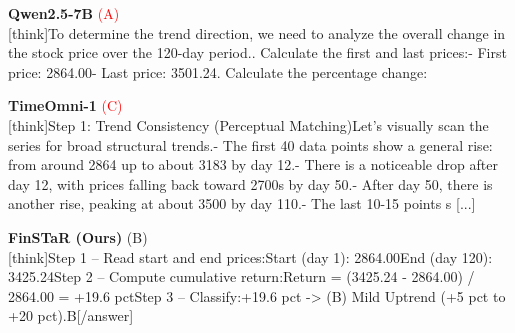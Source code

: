 \noindent
\begin{minipage}[t]{0.28\textwidth}
\colorbox{red!8}{\parbox{\dimexpr\textwidth-2\fboxsep}{
\textbf{Qwen2.5-7B} \textcolor{red}{(A)} \\[2pt]
\tiny
[think]\newline To determine the trend direction, we need to analyze the overall change in the stock price over the 120-day period.. Calculate the first and last prices:\newline    - First price: 2864.00\newline    - Last price: 3501.24. Calculate the percentage change:\newline    [\newline    (Percentage Change) = ( ((Last Price) - (First Price))((First Price)) )  100\newline    ]\newline    [\newline    (Percentage Change) = ( (3501.24 - 2864.00)(2864.00 [...]
}}
\end{minipage}
\hfill
\begin{minipage}[t]{0.28\textwidth}
\colorbox{red!8}{\parbox{\dimexpr\textwidth-2\fboxsep}{
\textbf{TimeOmni-1} \textcolor{red}{(C)} \\[2pt]
\tiny
[think]\newline Step 1: Trend Consistency (Perceptual Matching)\newline Let's visually scan the series for broad structural trends.\newline - The first  40 data points show a general rise: from around 2864 up to about 3183 by day 12.\newline - There is a noticeable drop after day 12, with prices falling back toward 2700s by day 50.\newline - After day 50, there is another rise, peaking at about 3500 by day 110.\newline - The last 10-15 points s [...]
}}
\end{minipage}
\hfill
\begin{minipage}[t]{0.41\textwidth}
\colorbox{green!10}{\parbox{\dimexpr\textwidth-2\fboxsep}{
\textbf{FinSTaR (Ours)} \textcolor{green!50!black}{(B)} \\[2pt]
\tiny
[think]\newline Step 1 -- Read start and end prices:\newline Start (day 1): 2864.00\newline End (day 120): 3425.24\newline Step 2 -- Compute cumulative return:\newline Return = (3425.24 - 2864.00) / 2864.00 = +19.6 pct\newline Step 3 -- Classify:\newline +19.6 pct -> (B) Mild Uptrend (+5 pct to +20 pct).\newline [/think]\newline [answer]B[/answer]
}}
\end{minipage}
\vspace{8pt}


